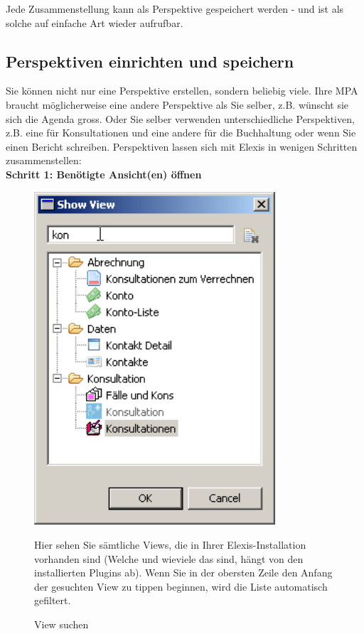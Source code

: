 Jede Zusammenstellung kann als Perspektive gespeichert werden - und ist als
solche auf einfache Art wieder aufrufbar.

\subsection{Perspektiven einrichten und speichern}
Sie können nicht nur eine Perspektive erstellen, sondern beliebig viele. Ihre MPA braucht möglicherweise eine
andere Perspektive als Sie selber, z.B. wünscht sie sich die Agenda gross. Oder Sie selber verwenden unterschiedliche
Perspektiven, z.B. eine für Konsultationen und eine andere für die Buchhaltung oder wenn
Sie einen Bericht schreiben. Perspektiven lassen sich mit Elexis in wenigen Schritten zusammenstellen:\\
\bigskip
\textbf{Schritt 1: Benötigte Ansicht(en) öffnen}\\
\begin{figure}[htbp]
     \begin{minipage}{0.4\textwidth}
      \centering
       \includegraphics[width=0.8\textwidth]{images/customize1}
       \caption{View suchen}
       	\label{fig:cust1}
     \end{minipage}\hfill
     \begin{minipage}{0.5\textwidth}
        Hier sehen Sie sämtliche Views, die in Ihrer Elexis-Installation vorhanden sind (Welche und wieviele das sind, hängt von den installierten Plugins ab). Wenn Sie in der obersten Zeile den Anfang der gesuchten View zu tippen beginnen, wird die Liste automatisch gefiltert.\\
        \vfill
     \end{minipage}
   \end{figure}
